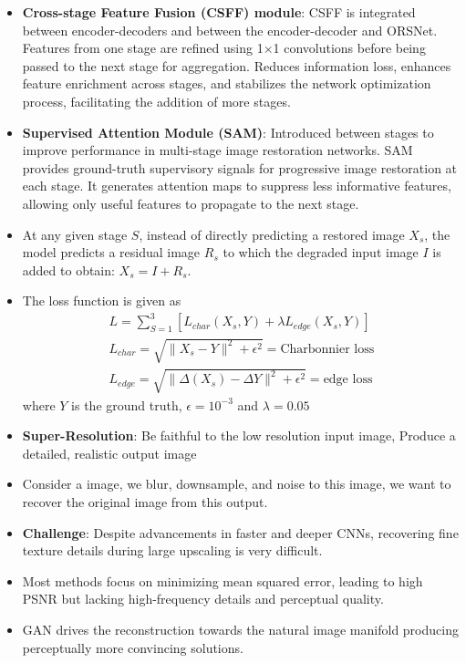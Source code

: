 \documentclass[a4paper]{article}
\begin{document}
\begin{itemize}
    \item \textbf{Cross-stage Feature Fusion (CSFF) module}: CSFF is integrated between encoder-decoders and between the encoder-decoder and ORSNet. Features from one stage are refined using 1×1 convolutions before being passed to the next stage for aggregation. Reduces information loss, enhances feature enrichment across stages, and stabilizes the network optimization process, facilitating the addition of more stages.
    \item \textbf{Supervised Attention Module (SAM)}: Introduced between stages to improve performance in multi-stage image restoration networks. SAM provides ground-truth supervisory signals for progressive image restoration at each stage. It generates attention maps to suppress less informative features, allowing only useful features to propagate to the next stage.
    \item At any given stage $S$, instead of directly predicting a restored image $X_s$, the model predicts a residual image $R_s$ to which the degraded input image $I$ is added to obtain: $X_s = I + R_s$. 
    \item The loss function is given as
    \begin{equation*}
        \begin{split}
            L=\sum_{S=1}^3[L_{char}(X_s,Y)+\lambda L_{edge}(X_s,Y)]\\
            L_{char}=\sqrt{\lVert X_s-Y\rVert^2+\epsilon^2}=\text{Charbonnier loss}\\
            L_{edge}=\sqrt{\lVert \Delta(X_s)-\Delta Y\rVert^2+\epsilon^2}=\text{edge loss}
        \end{split}
    \end{equation*}
    where $Y$ is the ground truth, $\epsilon=10^{-3}$ and $\lambda=0.05$
    \item \textbf{Super-Resolution}: Be faithful to the low resolution input image, Produce a detailed, realistic output image
    \item Consider a image, we blur, downsample, and noise to this image, we want to recover the original image from this output.
    \item \textbf{Challenge}: Despite advancements in faster and deeper CNNs, recovering fine texture details during large upscaling is very difficult.
    \item Most methods focus on minimizing mean squared error, leading to high PSNR but lacking high-frequency details and perceptual quality.
    \item GAN drives the reconstruction towards the natural image manifold producing perceptually more convincing solutions.

\end{itemize}
\end{document}
